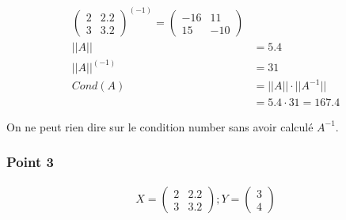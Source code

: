 \begin{equation}
	\begin{aligned}
		\begin{pmatrix}
			2 & 2.2\\
			3 & 3.2
		\end{pmatrix}^{(-1)} = 
		\begin{pmatrix}
			-16 & 11\\
			15 & -10
		\end{pmatrix}\\
		||A|| &= 5.4\\
		||A||^{(-1)} &= 31\\
		Cond (A) &= ||A|| \cdot ||A^{-1}||\\
		&= 5.4 \cdot 31 = 167.4
	\end{aligned}
\end{equation}

On ne peut rien dire sur le condition number sans avoir calculé $A^{-1}$.

\subsubsection{Point 3}

\begin{equation}
	\begin{aligned}X = 
		\begin{pmatrix}
			2 & 2.2\\
			3 & 3.2
		\end{pmatrix}; Y = 
		\begin{pmatrix}
			3\\
			4
		\end{pmatrix}
	\end{aligned}
\end{equation}